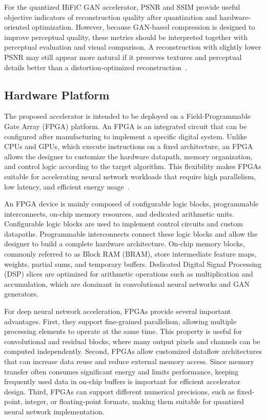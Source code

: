 For the quantized HiFiC GAN accelerator, PSNR and SSIM provide useful objective indicators of reconstruction quality after quantization and hardware-oriented optimization. However, because GAN-based compression is designed to improve perceptual quality, these metrics should be interpreted together with perceptual evaluation and visual comparison. A reconstruction with slightly lower PSNR may still appear more natural if it preserves textures and perceptual details better than a distortion-optimized reconstruction~\cite{blau2018perception,mentzer2020high,huynh2008scope,wang2004ssim}.

\subsection{Hardware Platform}

The proposed accelerator is intended to be deployed on a Field-Programmable Gate Array (FPGA) platform. An FPGA is an integrated circuit that can be configured after manufacturing to implement a specific digital system. Unlike CPUs and GPUs, which execute instructions on a fixed architecture, an FPGA allows the designer to customize the hardware datapath, memory organization, and control logic according to the target algorithm. This flexibility makes FPGAs suitable for accelerating neural network workloads that require high parallelism, low latency, and efficient energy usage~\cite{kuon2008fpga,sze2017efficient}.

An FPGA device is mainly composed of configurable logic blocks, programmable interconnects, on-chip memory resources, and dedicated arithmetic units. Configurable logic blocks are used to implement control circuits and custom datapaths. Programmable interconnects connect these logic blocks and allow the designer to build a complete hardware architecture. On-chip memory blocks, commonly referred to as Block RAM (BRAM), store intermediate feature maps, weights, partial sums, and temporary buffers. Dedicated Digital Signal Processing (DSP) slices are optimized for arithmetic operations such as multiplication and accumulation, which are dominant in convolutional neural networks and GAN generators.

For deep neural network acceleration, FPGAs provide several important advantages. First, they support fine-grained parallelism, allowing multiple processing elements to operate at the same time. This property is useful for convolutional and residual blocks, where many output pixels and channels can be computed independently. Second, FPGAs allow customized dataflow architectures that can increase data reuse and reduce external memory access. Since memory transfer often consumes significant energy and limits performance, keeping frequently used data in on-chip buffers is important for efficient accelerator design. Third, FPGAs can support different numerical precisions, such as fixed-point, integer, or floating-point formats, making them suitable for quantized neural network implementation.

